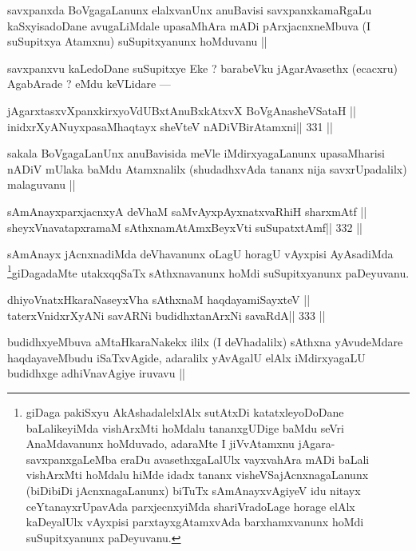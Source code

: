 \begin{artha}
savxpanxda BoVgagaLanunx elalxvanUnx anuBavisi savxpanxkamaRgaLu kaSxyisadoDane avugaLiMdale upasaMhAra mADi pArxjacnxneMbuva (I suSupitxya Atamxnu) suSupitxyanunx hoMduvanu ||
\end{artha}

\begin{artha}
savxpanxvu kaLedoDane suSupitxye Eke ? barabeVku jAgarAvasethx (ecacxru) AgabArade ? eMdu keVLidare ---
\end{artha}

\begin{shl}
jAgarxtasxvXpanxkirxyoVdUBxtAnuBxkAtxvX BoVgAnasheVSataH ||
inidxrXyANuyxpasaMhaqtayx sheVteV nADiVBirAtamxni\hfill || 331 ||
\end{shl}

\begin{artha}
sakala BoVgagaLanUnx anuBavisida meVle iMdirxyagaLanunx upasaMharisi nADiV mUlaka baMdu Atamxnalilx (shudadhxvAda tananx nija savxrUpadalilx) malaguvanu ||
\end{artha}

\begin{shl}
sAmAnayxparxjacnxyA deVhaM saMvAyxpAyxnatxvaRhiH sharxmAtf ||
sheyxVnavatapxramaM sAthxnamAtAmx\s BeyxVti suSupatxtAmf\hfill || 332 ||
\end{shl}

\begin{artha}
sAmAnayx jAcnxnadiMda deVhavanunx oLagU horagU vAyxpisi AyAsadiMda \footnote[1]{giDaga pakiSxyu AkAshadalelxlAlx sutAtxDi katatxleyoDoDane baLalikeyiMda vishArxMti hoMdalu tananxgUDige baMdu seVri AnaMdavanunx hoMduvado, adaraMte I jiVvAtamxnu jAgara-savxpanxgaLeMba eraDu avasethxgaLalUlx vayxvahAra mADi baLali vishArxMti hoMdalu hiMde idadx tananx visheVSajAcnxnagaLanunx (biDibiDi jAcnxnagaLanunx) biTuTx sAmAnayxvAgiyeV idu nitayx ceYtanayxrUpavAda parxjecnxyiMda shariVradoLage horage elAlx kaDeyalUlx vAyxpisi parxtayxgAtamxvAda barxhamxvanunx hoMdi suSupitxyanunx paDeyuvanu.}giDagadaMte utakxqqSaTx sAthxnavanunx hoMdi suSupitxyanunx paDeyuvanu.
\end{artha}

\begin{shl}
dhiyoV\s natxHkaraNaseyxVha sAthxnaM haqdayamiSayxteV ||
taterxVnidxrXyANi savARNi budidhxtanArxNi savaRdA\hfill || 333 ||
\end{shl}

\begin{artha}
budidhxyeMbuva aMtaHkaraNakekx ililx (I deVhadalilx) sAthxna yAvudeMdare haqdayaveMbudu iSaTxvAgide, adaralilx yAvAgalU elAlx iMdirxyagaLU budidhxge adhiVnavAgiye iruvavu ||
\end{artha}

